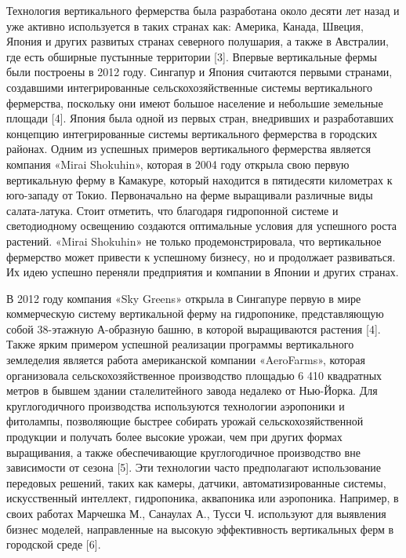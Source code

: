 \begin{multicols}{2}
Технология вертикального фермерства была разработана около десяти лет
назад и уже активно используется в таких странах как: Америка, Канада,
Швеция, Япония и других развитых странах северного полушария, а также в
Австралии, где есть обширные пустынные территории {[}3{]}. Впервые
вертикальные фермы были построены в 2012 году. Сингапур и Япония
считаются первыми странами, создавшими интегрированные
сельскохозяйственные системы вертикального фермерства, поскольку они
имеют большое население и небольшие земельные площади {[}4{]}. Япония
была одной из первых стран, внедривших и разработавших концепцию
интегрированные системы вертикального фермерства в городских районах.
Одним из успешных примеров вертикального фермерства является компания
«Mirai Shokuhin», которая в 2004 году открыла свою первую вертикальную
ферму в Камакуре, который находится в пятидесяти километрах к юго-западу
от Токио. Первоначально на ферме выращивали различные виды
салата-латука. Стоит отметить, что благодаря гидропонной системе и
светодиодному освещению создаются оптимальные условия для успешного
роста растений. «Mirai Shokuhin» не только продемонстрировала, что
вертикальное фермерство может привести к успешному бизнесу, но и
продолжает развиваться. Их идею успешно переняли предприятия и компании
в Японии и других странах.

В 2012 году компания «Sky Greens» открыла в Сингапуре первую в мире
коммерческую систему вертикальной ферму на гидропонике, представляющую
собой 38-этажную А-образную башню, в которой выращиваются растения
{[}4{]}. Также ярким примером успешной реализации программы
вертикального земледелия является работа американской компании
«AeroFarms», которая организовала сельскохозяйственное производство
площадью 6 410 квадратных метров в бывшем здании сталелитейного завода
недалеко от Нью-Йорка. Для круглогодичного производства используются
технологии аэропоники и фитолампы, позволяющие быстрее собирать урожай
сельскохозяйственной продукции и получать более высокие урожаи, чем при
других формах выращивания, а также обеспечивающие круглогодичное
производство вне зависимости от сезона {[}5{]}. Эти технологии часто
предполагают использование передовых решений, таких как камеры, датчики,
автоматизированные системы, искусственный интеллект, гидропоника,
аквапоника или аэропоника. Например, в своих работах Марчешка М.,
Санаулах А., Тусси Ч. используют для выявления бизнес моделей,
направленные на высокую эффективность вертикальных ферм в городской
среде {[}6{]}.


\end{multicols}
